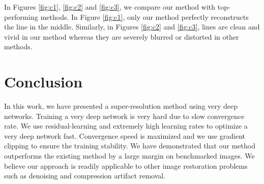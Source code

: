 \documentclass[10pt,twocolumn,letterpaper]{article}
\begin{document}
In Figures \ref{fig:c1}, \ref{fig:c2} and \ref{fig:c3}, we compare our method with top-performing methods. In Figure \ref{fig:c1}, only our method perfectly reconstructs the line in the middle. Similarly, in Figures \ref{fig:c2} and \ref{fig:c3}, lines are clean and vivid in our method whereas they are severely blurred or distorted in other methods. 

\section{Conclusion}
In this work, we have presented a super-resolution method using very deep networks. Training a very deep network is very hard due to slow convergence rate. We use residual-learning and extremely high learning rates to optimize a very deep network fast. Convergence speed is maximized and we use gradient clipping to ensure the training stability. We have demonstrated that our method outperforms the existing method by a large margin on benchmarked images. We believe our approach is readily applicable to other image restoration problems such as denoising and compression artifact removal.

{\small
	
	
}
\end{document}
